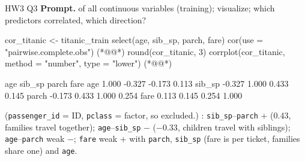 \begin{qbox}{HW3 Q3}
\textbf{Prompt.}  of all continuous variables (training); visualize; which predictors correlated, which direction?
\begin{rcode}
cor_titanic <- titanic_train %
  select(age, sib_sp, parch, fare) %
  cor(use = "pairwise.complete.obs")  (*@@*)
round(cor_titanic, 3)
corrplot(cor_titanic, method = "number", type = "lower")  (*@@*)
\end{rcode}
\begin{routput}
          age sib_sp  parch  fare
age     1.000 -0.327 -0.173 0.113
sib_sp -0.327  1.000  0.433 0.145
parch  -0.173  0.433  1.000 0.254
fare    0.113  0.145  0.254 1.000
\end{routput}
\ans (\texttt{passenger\_id} = ID, \texttt{pclass} = factor, so excluded.) : \texttt{sib\_sp}--\texttt{parch} $+$ (0.43, families travel together); \texttt{age}--\texttt{sib\_sp} $-$ ($-0.33$, children travel with siblings); \texttt{age}--\texttt{parch} weak $-$; \texttt{fare} weak $+$ with \texttt{parch}, \texttt{sib\_sp} (fare is per ticket, families share one) and \texttt{age}.
\end{qbox}

